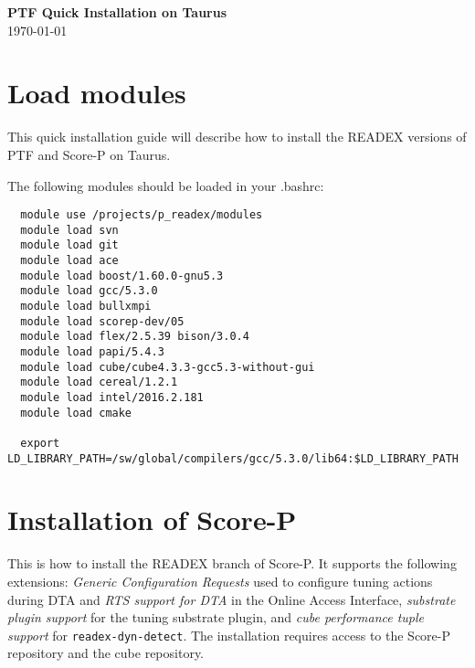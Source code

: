 \documentclass[12pt]{article}
\begin{document}
\begin{titlepage}\centering
\vspace*{\fill}
\Huge \textbf{PTF Quick Installation on Taurus }\\
{\large \today}\\[3cm] %
\vspace*{\fill}
\end{titlepage}
\clearpage
\newpage

\section{Load modules}

This quick installation guide will describe how to install the READEX versions of PTF and Score-P on Taurus.

The following modules should be loaded in your .bashrc:

\begin{verbatim}
  module use /projects/p_readex/modules
  module load svn
  module load git
  module load ace
  module load boost/1.60.0-gnu5.3
  module load gcc/5.3.0
  module load bullxmpi
  module load scorep-dev/05
  module load flex/2.5.39 bison/3.0.4
  module load papi/5.4.3
  module load cube/cube4.3.3-gcc5.3-without-gui
  module load cereal/1.2.1
  module load intel/2016.2.181
  module load cmake
  
  export LD_LIBRARY_PATH=/sw/global/compilers/gcc/5.3.0/lib64:$LD_LIBRARY_PATH

\end{verbatim}

\section{Installation of Score-P}

This is how to install the READEX branch of Score-P. It supports the following extensions:
\emph{Generic Configuration Requests} used to configure tuning actions during DTA and \emph{RTS support for DTA} in the Online Access Interface, \emph{substrate plugin support} for the tuning substrate plugin, and \emph{cube performance tuple support} for {\tt readex-dyn-detect}. The installation requires access to the Score-P repository and the cube repository.
\end{document}
